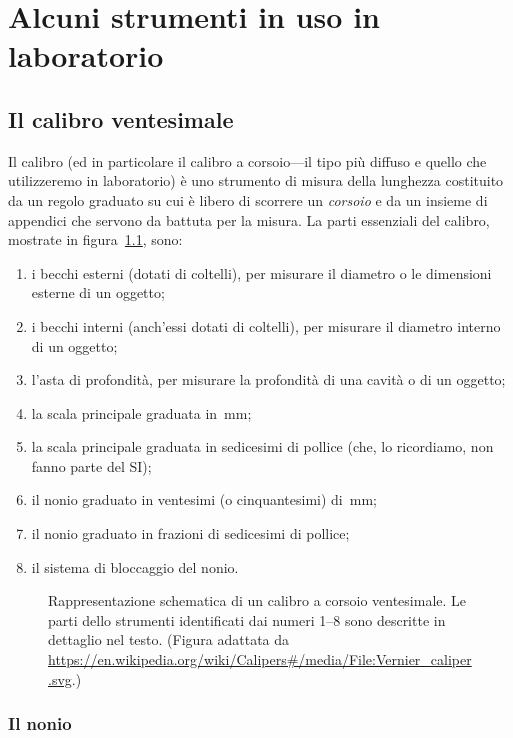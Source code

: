 \chapter{Alcuni strumenti in uso in laboratorio}
\label{sec:strumenti}

\section{Il calibro ventesimale}

Il calibro (ed in particolare il calibro a corsoio---il tipo più diffuso e
quello che utilizzeremo in laboratorio) è uno strumento di misura della
lunghezza costituito da un regolo graduato su cui è libero di scorrere un
\emph{corsoio} e da un insieme di appendici che servono da battuta per la
misura. La parti essenziali del calibro, mostrate in figura~\ref{fig:calibro},
sono:
\begin{enumerate}
\item i becchi esterni (dotati di coltelli), per misurare il diametro o le
  dimensioni esterne di un oggetto;
\item i becchi interni (anch'essi dotati di coltelli), per misurare il diametro
  interno di un oggetto;
\item l'asta di profondità, per misurare la profondità di una cavità o
  di un oggetto;
\item la scala principale graduata in~mm;
\item la scala principale graduata in sedicesimi di pollice
  (che, lo ricordiamo, non fanno parte del SI);
\item il nonio graduato in ventesimi (o cinquantesimi) di~mm;
\item il nonio graduato in frazioni di sedicesimi di pollice;
\item il sistema di bloccaggio del nonio.
\end{enumerate}

\begin{figure}[!htbp]
  \centering
  \def\svgwidth{\columnwidth}
  
  \caption{Rappresentazione schematica di un calibro a corsoio ventesimale.
    Le parti dello strumenti identificati dai numeri 1--8 sono descritte
    in dettaglio nel testo. (Figura adattata da \url{https://en.wikipedia.org/wiki/Calipers\#/media/File:Vernier_caliper.svg}.)}
  \label{fig:calibro}
\end{figure}


\subsection{Il nonio}


